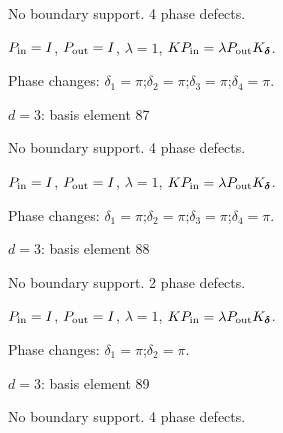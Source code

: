 No boundary support. 4 phase defects.
\begin{center}
\end{center}
\vspace{-1mm}
$P_{\rm in}=I$, \quad $P_{\rm out}=I$, \quad $\lambda=1$, \qquad $K P_{\rm in}=\lambda P_{\rm out}K_{\boldsymbol\delta}$.
\par\smallskip\begin{minipage}{.98\linewidth}\small Phase changes: $\delta_{1}=\pi$;\quad $\delta_{2}=\pi$;\quad $\delta_{3}=\pi$;\quad $\delta_{4}=\pi$.\end{minipage}
\vfill
{\footnotesize\texttt{}}
\newpage
{}
{\Large $d=3$: basis element 87}\par
No boundary support. 4 phase defects.
\begin{center}
\end{center}
\vspace{-1mm}
$P_{\rm in}=I$, \quad $P_{\rm out}=I$, \quad $\lambda=1$, \qquad $K P_{\rm in}=\lambda P_{\rm out}K_{\boldsymbol\delta}$.
\par\smallskip\begin{minipage}{.98\linewidth}\small Phase changes: $\delta_{1}=\pi$;\quad $\delta_{2}=\pi$;\quad $\delta_{3}=\pi$;\quad $\delta_{4}=\pi$.\end{minipage}
\vfill
{\footnotesize\texttt{}}
\newpage
{}
{\Large $d=3$: basis element 88}\par
No boundary support. 2 phase defects.
\begin{center}
\end{center}
\vspace{-1mm}
$P_{\rm in}=I$, \quad $P_{\rm out}=I$, \quad $\lambda=1$, \qquad $K P_{\rm in}=\lambda P_{\rm out}K_{\boldsymbol\delta}$.
\par\smallskip\begin{minipage}{.98\linewidth}\small Phase changes: $\delta_{1}=\pi$;\quad $\delta_{2}=\pi$.\end{minipage}
\vfill
{\footnotesize\texttt{}}
\newpage
{}
{\Large $d=3$: basis element 89}\par
No boundary support. 4 phase defects.
\begin{center}
\end{center}
